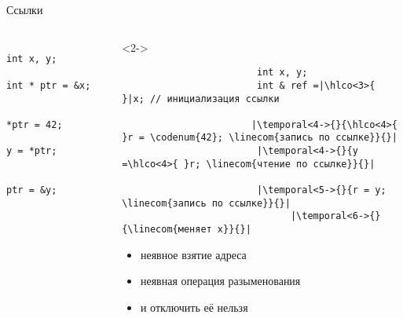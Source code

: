 \documentclass[aspectratio=169,14pt]{beamer}
\begin{document}
    \begin{frame}[fragile]{Ссылки}
        \begin{columns}[T]
            \begin{column}{0.4\textwidth}
                \begin{verbatim}
                    int x, y;
                    int * ptr = &x;

                    *ptr = 42;
                    y = *ptr;

                    ptr = &y;
                \end{verbatim}
            \end{column}
            \begin{column}{0.6\textwidth}
                \begin{onlyenv}<2->
                    \begin{verbatim}
                        int x, y;
                        int & ref =|\hlco<3>{ }|x; // инициализация ссылки

                       |\temporal<4->{}{\hlco<4>{ }r = \codenum{42}; \linecom{запись по ссылке}}{}|
                        |\temporal<4->{}{y =\hlco<4>{ }r; \linecom{чтение по ссылке}}{}|

                        |\temporal<5->{}{r = y; \linecom{запись по ссылке}}{}|
                              |\temporal<6->{}{\linecom{меняет x}}{}|
                    \end{verbatim}
                \end{onlyenv}
                \begin{itemize}
                    \item<3-> неявное взятие адреса 
                    \item<4-> неявная операция разыменования
                    \item<5-> и отключить её нельзя
                \end{itemize}
            \end{column}
        \end{columns}
    \end{frame}
\end{document}

